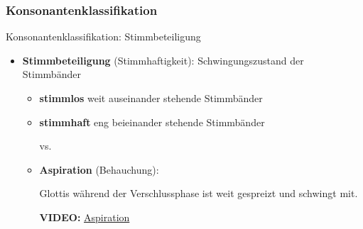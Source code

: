 \subsubsection{Konsonantenklassifikation}

\begin{frame}{Konsonantenklassifikation: Stimmbeteiligung}

	\begin{itemize}
		\item \textbf{Stimmbeteiligung} (Stimmhaftigkeit): Schwingungszustand der Stimmbänder
		
		\begin{itemize}
			
			\item \textbf{stimmlos} \ras weit auseinander stehende Stimmbänder
			
			\item \textbf{stimmhaft} \ras eng beieinander stehende Stimmbänder
			
			\ea \textipa{[ p ]} vs. \textipa{[ b ]}
			\z

			
			\item \textbf{Aspiration} (Behauchung):\par
				Glottis während der Verschlussphase ist weit gespreizt und schwingt mit.

			\ea \textipa{[ \super h ]}
			\z

                        \textbf{VIDEO:} \href{run:material/02-aspiration.mp4}{Aspiration}
		\end{itemize}

	\end{itemize}
	
\end{frame}



